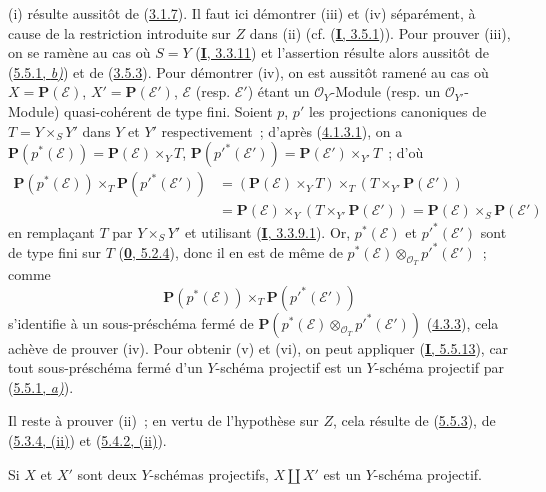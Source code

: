 (i) résulte aussitôt de (\hyperref[II.3.1.7-fr]{3.1.7}). Il faut ici
démontrer (iii) et (iv) séparément, à cause de la restriction introduite sur
$Z$ dans (ii) (cf. (\hyperref[I.3.5.1-fr]{\textbf{I}, 3.5.1})). Pour prouver (iii), on
se ramène au cas où $S=Y$ (\hyperref[I.3.3.11-fr]{\textbf{I}, 3.3.11}) et l'assertion
résulte alors aussitôt de (\hyperref[II.5.5.1-fr]{5.5.1, \emph{b)}}) et de
(\hyperref[II.3.5.3-fr]{3.5.3}). Pour démontrer (iv), on est aussitôt ramené
au cas où $X=\mathbf{P}(\mathcal{E})$, $X'=\mathbf{P}(\mathcal{E}')$,
$\mathcal{E}$ (resp. $\mathcal{E}'$) étant un $\mathcal{O}_Y$-Module (resp.
un $\mathcal{O}_{Y'}$-Module) quasi-cohérent de type fini. Soient $p$, $p'$ les
projections canoniques de $T=Y\times_SY'$ dans $Y$ et $Y'$ respectivement~;
d'après (\hyperref[II.4.1.3.1-fr]{4.1.3.1}), on a
$\mathbf{P}(p^*(\mathcal{E}))=\mathbf{P}(\mathcal{E})\times_YT$,
$\mathbf{P}(p'^*(\mathcal{E}'))=\mathbf{P}(\mathcal{E}')\times_{Y'}T$~; d'où
\begin{align*}
\mathbf{P}(p^*(\mathcal{E}))\times_T\mathbf{P}(p'^*(\mathcal{E}'))
&=(\mathbf{P}(\mathcal{E})\times_YT)\times_T
(T\times_{Y'}\mathbf{P}(\mathcal{E}'))\\
&=\mathbf{P}(\mathcal{E})\times_Y
(T\times_{Y'}\mathbf{P}(\mathcal{E}'))
=\mathbf{P}(\mathcal{E})\times_S\mathbf{P}(\mathcal{E}')
\end{align*}
en remplaçant $T$ par $Y\times_SY'$ et utilisant
(\hyperref[I.3.3.9.1-fr]{\textbf{I}, 3.3.9.1}). Or, $p^*(\mathcal{E})$ et
$p'^*(\mathcal{E}')$ sont de type fini sur $T$
(\hyperref[0.5.2.4-fr]{\textbf{0}, 5.2.4}), donc il en est de même de
$p^*(\mathcal{E})\otimes_{\mathcal{O}_T}p'^*(\mathcal{E}')$~; comme
\[
\mathbf{P}(p^*(\mathcal{E}))\times_T\mathbf{P}(p'^*(\mathcal{E}'))
\]
s'identifie à un sous-préschéma fermé de
$\mathbf{P}(p^*(\mathcal{E})\otimes_{\mathcal{O}_T}p'^*(\mathcal{E}'))$
(\hyperref[II.4.3.3-fr]{4.3.3}), cela achève de prouver (iv). Pour obtenir (v)
et (vi), on peut appliquer (\hyperref[I.5.5.13-fr]{\textbf{I}, 5.5.13}), car tout
sous-préschéma fermé d'un $Y$-schéma projectif est un $Y$-schéma projectif par
(\hyperref[II.5.5.1-fr]{5.5.1, \emph{a)}}).

Il reste à prouver (ii)~; en vertu de l'hypothèse sur $Z$, cela résulte de
(\hyperref[II.5.5.3-fr]{5.5.3}), de
(\hyperref[II.5.3.4-fr]{5.3.4, (ii)}) et
(\hyperref[II.5.4.2-fr]{5.4.2, (ii)}).

\begin{proposition}[5.5.6]
\label{II.5.5.6-fr}
Si $X$ et $X'$ sont deux $Y$-schémas projectifs, $X\amalg X'$ est un
$Y$-schéma projectif.
\end{proposition}

